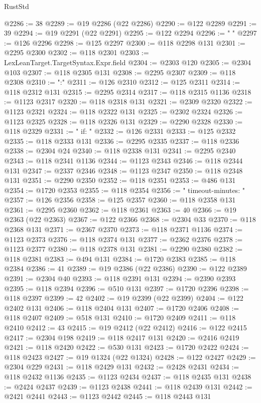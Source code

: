 \begin{lexlean}{RustStd}
\begin{coremodule}
@2286 := 38
@2289 := @19 @2286 (@22 @2286)
@2290 := @122 @2289
@2291 := 39
@2294 := @19 @2291 (@22 @2291)
@2295 := @122 @2294
@2296 := "  "
@2297 := @126 @2296
@2298 := @125 @2297
@2300 := @118 @2298 @131
@2301 := @2295 @2300
@2302 := @118 @2301
@2303 := LexLeanTarget.TargetSyntax.Expr.field
@2304 := @2303 @120
@2305 := @2304 @103
@2307 := @118 @2305 @131
@2308 := @2295 @2307
@2309 := @118 @2308
@2310 := ":"
@2311 := @126 @2310
@2312 := @125 @2311
@2314 := @118 @2312 @131
@2315 := @2295 @2314
@2317 := @118 @2315 @1136
@2318 := @1123 @2317
@2320 := @118 @2318 @131
@2321 := @2309 @2320
@2322 := @1123 @2321
@2324 := @118 @2322 @131
@2325 := @2302 @2324
@2326 := @1123 @2325
@2328 := @118 @2326 @131
@2329 := @2290 @2328
@2330 := @118 @2329
@2331 := "    if: "
@2332 := @126 @2331
@2333 := @125 @2332
@2335 := @118 @2333 @131
@2336 := @2295 @2335
@2337 := @118 @2336
@2338 := @2304 @24
@2340 := @118 @2338 @131
@2341 := @2295 @2340
@2343 := @118 @2341 @1136
@2344 := @1123 @2343
@2346 := @118 @2344 @131
@2347 := @2337 @2346
@2348 := @1123 @2347
@2350 := @118 @2348 @131
@2351 := @2290 @2350
@2352 := @118 @2351
@2353 := @486 @131
@2354 := @1720 @2353
@2355 := @118 @2354
@2356 := "    timeout-minutes: "
@2357 := @126 @2356
@2358 := @125 @2357
@2360 := @118 @2358 @131
@2361 := @2295 @2360
@2362 := @118 @2361
@2363 := 40
@2366 := @19 @2363 (@22 @2363)
@2367 := @122 @2366
@2368 := @2304 @33
@2370 := @118 @2368 @131
@2371 := @2367 @2370
@2373 := @118 @2371 @1136
@2374 := @1123 @2373
@2376 := @118 @2374 @131
@2377 := @2362 @2376
@2378 := @1123 @2377
@2380 := @118 @2378 @131
@2381 := @2290 @2380
@2382 := @118 @2381
@2383 := @494 @131
@2384 := @1720 @2383
@2385 := @118 @2384
@2386 := 41
@2389 := @19 @2386 (@22 @2386)
@2390 := @122 @2389
@2391 := @2304 @40
@2393 := @118 @2391 @131
@2394 := @2390 @2393
@2395 := @118 @2394
@2396 := @510 @131
@2397 := @1720 @2396
@2398 := @118 @2397
@2399 := 42
@2402 := @19 @2399 (@22 @2399)
@2404 := @122 @2402 @131
@2406 := @118 @2404 @131
@2407 := @1720 @2406
@2408 := @118 @2407
@2409 := @518 @131
@2410 := @1720 @2409
@2411 := @118 @2410
@2412 := 43
@2415 := @19 @2412 (@22 @2412)
@2416 := @122 @2415
@2417 := @2304 @198
@2419 := @118 @2417 @131
@2420 := @2416 @2419
@2421 := @118 @2420
@2422 := @530 @131
@2423 := @1720 @2422
@2424 := @118 @2423
@2427 := @19 @1324 (@22 @1324)
@2428 := @122 @2427
@2429 := @2304 @229
@2431 := @118 @2429 @131
@2432 := @2428 @2431
@2434 := @118 @2432 @1136
@2435 := @1123 @2434
@2437 := @118 @2435 @131
@2438 := @2424 @2437
@2439 := @1123 @2438
@2441 := @118 @2439 @131
@2442 := @2421 @2441
@2443 := @1123 @2442
@2445 := @118 @2443 @131

\end{coremodule}
\end{lexlean}
